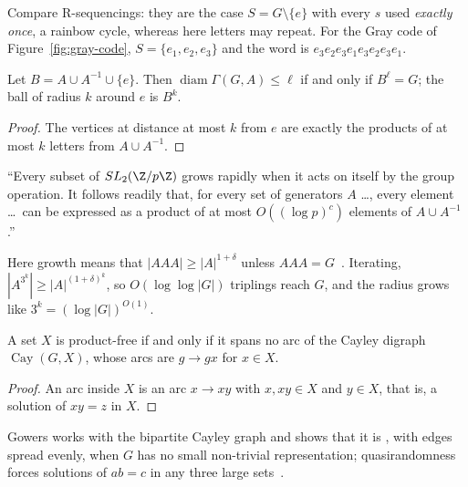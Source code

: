 Compare R-sequencings: they are the case $S=G\setminus\{e\}$ with every $s$ used \emph{exactly once}, a rainbow cycle, whereas here letters may repeat. For the Gray code of Figure~\ref{fig:gray-code}, $S=\{e_1,e_2,e_3\}$ and the word is $e_3e_2e_3e_1e_3e_2e_3e_1$.


\begin{proposition}\label{prop:diam}
Let $B=A\cup A^{-1}\cup\{e\}$. Then $\operatorname{diam}\Gamma(G,A)\leq\ell$ if and only if $B^\ell=G$; the ball of radius $k$ around $e$ is $B^k$.
\end{proposition}

\begin{proof}
The vertices at distance at most $k$ from $e$ are exactly the products of at most $k$ letters from $A\cup A^{-1}$.
\end{proof}

\begin{theorem}\label{thm:helfgott}
``Every subset of $SL_2(\Z/p\Z)$ grows rapidly when it acts on itself by the group operation. It follows readily that, for every set of generators $A$ \dots, every element \dots\ can be expressed as a product of at most $O((\log p)^c)$ elements of $A\cup A^{-1}$.''
\end{theorem}

Here growth means that $|AAA|\geq|A|^{1+\delta}$ unless $AAA=G$~\cite{ps10}. Iterating, $|A^{3^k}|\geq|A|^{(1+\delta)^k}$, so $O(\log\log|G|)$ triplings reach $G$, and the radius grows like $3^k=(\log|G|)^{O(1)}$.


\begin{proposition}\label{prop:pf}
A set $X$ is product-free if and only if it spans no arc of the Cayley digraph $\operatorname{Cay}(G,X)$, whose arcs are $g\to gx$ for $x\in X$.
\end{proposition}

\begin{proof}
An arc inside $X$ is an arc $x\to xy$ with $x,xy\in X$ and $y\in X$, that is, a solution of $xy=z$ in $X$.
\end{proof}

Gowers works with the bipartite Cayley graph and shows that it is , with edges spread evenly, when $G$ has no small non-trivial representation; quasirandomness forces solutions of $ab=c$ in any three large sets~\cite[\S1]{gow08}.


